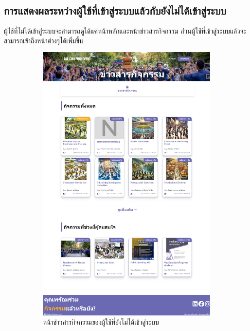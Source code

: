 \subsection{การแสดงผลระหว่างผู้ใช้ที่เข้าสู่ระบบแล้วกับยังไม่ได้เข้าสู่ระบบ}
ผู้ใช้ที่ไม่ได้เข้าสู่ระบบจะสามารถดูได้แค่หน้าหลักและหน้าข่าวสารกิจกรรม ส่วนผู้ใช้ที่เข้าสู่ระบบแล้วจะสามารถเข้าถึงหน้าต่างๆได้เพิ่มขึ้น
\begin{figure}[h]
  \centering
  \begin{subfigure}[b]{0.4\linewidth}
    \includegraphics[width=\linewidth]{image/web/notLog-activity.jpeg}
    \caption{หน้าข่าวสารกิจกรรมของผู้ใช้ที่ยังไม่ได้เข้าสู่ระบบ}
  \end{subfigure}
  \hfill
  \begin{subfigure}[b]{0.4\linewidth}

\end{subfigure}
\end{figure}
